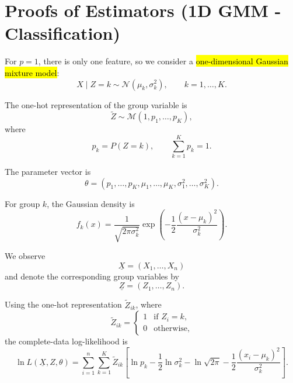 \section{Proofs of Estimators (1D GMM - Classification)}

For $p=1$, there is only one feature, so we consider a
\hl{one-dimensional Gaussian mixture model}:
\begin{equation*}
X\mid Z=k\sim\mathcal{N}(\mu_k,\sigma_k^2),
\qquad k=1,\ldots,K.
\end{equation*}

The one-hot representation of the group variable is
\begin{equation*}
\tilde{Z}\sim\mathcal{M}(1,p_1,\ldots,p_K),
\end{equation*}
where
\begin{equation*}
p_k=P(Z=k),
\qquad
\sum_{k=1}^Kp_k=1.
\end{equation*}

The parameter vector is
\begin{equation*}
\theta=
(p_1,\ldots,p_K,\mu_1,\ldots,\mu_K,
\sigma_1^2,\ldots,\sigma_K^2).
\end{equation*}

For group $k$, the Gaussian density is
\begin{equation*}
f_k(x)
=
\frac{1}{\sqrt{2\pi\sigma_k^2}}
\exp\left(
-\frac{1}{2}
\frac{(x-\mu_k)^2}{\sigma_k^2}
\right).
\end{equation*}

We observe
\begin{equation*}
\underline{X}=(X_1,\ldots,X_n)
\end{equation*}
and denote the corresponding group variables by
\begin{equation*}
\underline{Z}=(Z_1,\ldots,Z_n).
\end{equation*}

Using the one-hot representation $\tilde{Z}_{ik}$, where
\begin{equation*}
\tilde{Z}_{ik}
=
\begin{cases}
1 & \text{if } Z_i=k,\\
0 & \text{otherwise},
\end{cases}
\end{equation*}
the complete-data log-likelihood is
\begin{equation*}
\ln L(\underline{X},Z,\theta)
=
\sum_{i=1}^{n}\sum_{k=1}^{K}
\tilde{Z}_{ik}
\left[
\ln p_k
-\frac{1}{2}\ln\sigma_k^2
-\ln\sqrt{2\pi}
-\frac{1}{2}
\frac{(x_i-\mu_k)^2}{\sigma_k^2}
\right].
\end{equation*}

